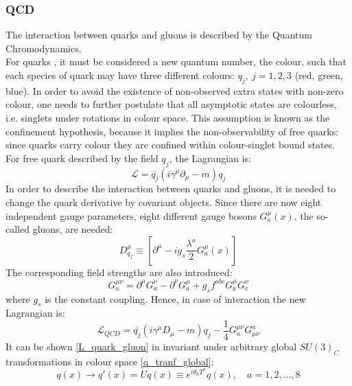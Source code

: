 \subsubsection{QCD}\label{QCD}
The interaction between quarks and gluons is described by the Quantum Chromodynamics. \\
For quarks \cite{QCD}, it must be considered a new quantum number, the colour, such that each species of quark may have three different colours: $q_{j},\ j = 1, 2, 3$ (red, green, blue). In order to avoid the existence of non-observed extra states with non-zero colour, one needs to further postulate that all asymptotic states are colourless, i.e. singlets under rotations in colour space. This assumption is known as the confinement hypothesis, because it implies the non-observability of free quarks: since quarks carry colour they are confined within colour-singlet bound states. \\
For free quark described by the field $q_{j}$, the Lagrangian is:
\begin{equation}
\mathcal{L} = \bar{q_{j}}(i\gamma^{\mu}\partial_{\mu} - m)q_{j}
\label{L_quark}
\end{equation}
In order to describe the  interaction between quarks and gluons, it is needed to change the quark derivative by covariant objects. Since there are now eight independent gauge parameters, eight different gauge bosons $G^{\mu}_{a}(x)$, the so-called gluons, are needed:
\begin{equation}
D^{\mu}_{q_{f}} \equiv [\partial^{\mu}- ig_{s}\frac{\lambda^{a}}{2}G^{\mu}_{a}(x)]
\label{D_covariante_qcd}
\end{equation}
The corresponding field strengths are also introduced:
\begin{equation}
G^{\mu\nu}_{a} = \partial^{\mu}G^{\nu}_{a} - \partial^{\nu}G^{\mu}_{a} + g_{s}f^{abc}G^{\mu}_{b}G^{\nu}_{c}
\label{G_munu}
\end{equation}
where $g_{s}$ is the constant coupling.
Hence, in case of interaction the new Lagrangian is:
\begin{equation}
\mathcal{L}_{QCD} = \bar{q_{j}}(i\gamma^{\mu}D_{\mu} - m)q_{j} -\frac{1}{4}G^{\mu\nu}_{a}G^{a}_{\mu\nu}
\label{L_quark_gluon}
\end{equation}
It can be shown \ref{L_quark_gluon} in invariant under arbitrary global $SU(3)_{C}$ transformations in colour space \ref{q_tranf_global}:
\begin{equation}
q(x) \to q'(x) = Uq(x) \equiv e^{i\theta_{a}T^{a}}q(x), \quad a = 1, 2, ...,8
\label{q_tranf_global}
\end{equation}
